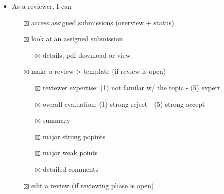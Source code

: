 \documentclass[nochapterpage,nopartpage,noheadingspace,numbersubsubsec,bigchapter,colorback,accentcolor=tud9c,10pt]{tudreport}
\begin{document}
\begin{itemize}
            \item As a reviewer, I can
            \begin{itemize}
                \item[$\boxtimes$] access assigned submissions (overview + status)
                \item[$\boxtimes$] look at an assigned submission
                \begin{itemize}
                    \item[$\boxtimes$] details, pdf download or view
                \end{itemize}
                \item[$\boxtimes$] make a review > template (if review is open)
                \begin{itemize}
                    \item[$\boxtimes$] reviewer expertise: (1) not familar w/ the topic - (5) expert
                    \item[$\boxtimes$] overall evaluation: (1) strong reject - (5) strong accept
                    \item[$\boxtimes$] summary
                    \item[$\boxtimes$] major strong popints
                    \item[$\boxtimes$] major weak points
                    \item[$\boxtimes$] detailed comments
                \end{itemize}
                \item[$\boxtimes$] edit a review (if reviewing phase is open)
            \end{itemize}


\end{itemize}
\end{document}
